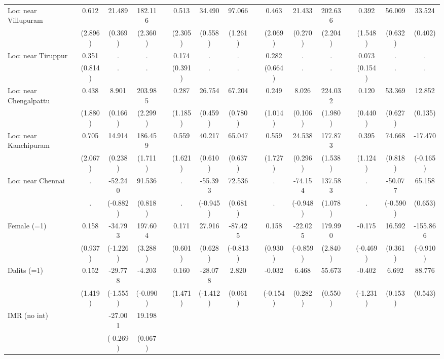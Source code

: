 {\begin{longtable}{@{\extracolsep{\fill}}lccccccccccccccc}
    Loc: near Villupuram & 0.612 & 21.489 & 182.116 &   & 0.513 & 34.490 & 97.066 &   & 0.463 & 21.433 & 202.636 &   & 0.392 & 56.009 & 33.524 \\
      & (2.896) & (0.369) & (2.360) &   & (2.305) & (0.558) & (1.261) &   & (2.069) & (0.270) & (2.204) &   & (1.548) & (0.632) & (0.402) \\
    Loc: near Tiruppur & 0.351 & . & . &   & 0.174 & . & . &   & 0.282 & . & . &   & 0.073 & . & . \\
      & (0.814) & . & . &   & (0.391) & . & . &   & (0.664) & . & . &   & (0.154) & . & . \\
    Loc: near Chengalpattu & 0.438 & 8.901 & 203.985 &   & 0.287 & 26.754 & 67.204 &   & 0.249 & 8.026 & 224.032 &   & 0.120 & 53.369 & 12.852 \\
      & (1.880) & (0.166) & (2.299) &   & (1.185) & (0.459) & (0.780) &   & (1.014) & (0.106) & (1.980) &   & (0.440) & (0.627) & (0.135) \\
    Loc: near Kanchipuram & 0.705 & 14.914 & 186.459 &   & 0.559 & 40.217 & 65.047 &   & 0.559 & 24.538 & 177.873 &   & 0.395 & 74.668 & -17.470 \\
      & (2.067) & (0.238) & (1.711) &   & (1.621) & (0.610) & (0.637) &   & (1.727) & (0.296) & (1.538) &   & (1.124) & (0.818) & (-0.165) \\
    Loc: near Chennai & . & -52.240 & 91.536 &   & . & -55.393 & 72.536 &   & . & -74.154 & 137.583 &   & . & -50.077 & 65.158 \\
      & . & (-0.882) & (0.818) &   & . & (-0.945) & (0.681) &   & . & (-0.948) & (1.078) &   & . & (-0.590) & (0.653) \\
    Female (=1) & 0.158 & -34.793 & 197.604 &   & 0.171 & 27.916 & -87.425 &   & 0.158 & -22.025 & 179.990 &   & -0.175 & 16.592 & -155.866 \\
      & (0.937) & (-1.226) & (3.288) &   & (0.601) & (0.628) & (-0.813) &   & (0.930) & (-0.859) & (2.840) &   & (-0.469) & (0.361) & (-0.910) \\
    Dalits (=1) & 0.152 & -29.778 & -4.203 &   & 0.160 & -28.078 & 2.820 &   & -0.032 & 6.468 & 55.673 &   & -0.402 & 6.692 & 88.776 \\
      & (1.419) & (-1.555) & (-0.090) &   & (1.471) & (-1.412) & (0.061) &   & (-0.154) & (0.282) & (0.550) &   & (-1.231) & (0.153) & (0.543) \\
    IMR (no int) &   & -27.001 & 19.198 &   &   &   &   &   &   &   &   &   &   &   &  \\
      &   & (-0.269) & (0.067) &   &   &   &   &   &   &   &   &   &   &   &  \\

\end{longtable}}
